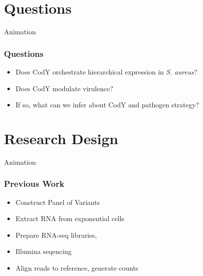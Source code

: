 \documentclass[10pt, compress]{beamer}
\begin{document}

\section{Questions}
\begin{frame}{Animation}
\frametitle{Questions}
\begin{itemize}[<+- | alert@+>]
	\item Does CodY orchestrate hierarchical expression in \textit{S. aureus}?
	\item Does CodY modulate virulence?
	\item If so, what can we infer about CodY and pathogen strategy?
\end{itemize}
\end{frame}

\section{Research Design}
\begin{frame}{Animation}
\frametitle{Previous Work}
\begin{itemize}[<+- | alert@+>]
	\item Construct Panel of Variants 
	\item Extract RNA from exponential cells
	\item Prepare RNA-seq libraries, 
	\item Illumina seqencing
	\item Align reads to reference, generate counts
\end{itemize}
\end{frame}
\end{document}
